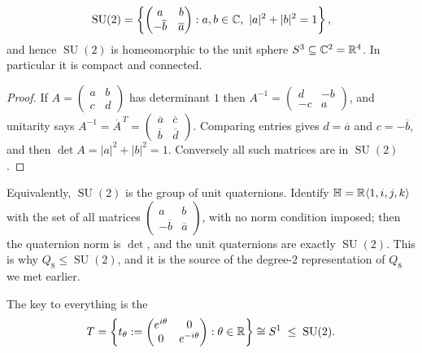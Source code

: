 \documentclass[a4paper]{scrartcl}
\newcommand{\SU}{\operatorname{SU}}
\newcommand{\gen}[1]{\langle #1 \rangle}
\newcommand{\HH}{\mathbb{H}}
\begin{document}
\begin{proposition}
	$$\SU(2) = \left\{\begin{pmatrix}a & b\\ -\overline b & \overline a\end{pmatrix} : a,b\in\C,\ |a|^2+|b|^2 = 1\right\},$$
	and hence $\SU(2)$ is homeomorphic to the unit sphere $S^3\subseteq\mathbb{C}^2 = \mathbb{R}^4$. In particular it is compact and connected.
\end{proposition}
\begin{proof}
	If $A = \left(\begin{smallmatrix}a&b\\c&d\end{smallmatrix}\right)$ has determinant $1$ then $A^{-1} = \left(\begin{smallmatrix}d&-b\\-c&a\end{smallmatrix}\right)$, and unitarity says $A^{-1} = \overline A^{\,T} = \left(\begin{smallmatrix}\overline a&\overline c\\ \overline b&\overline d\end{smallmatrix}\right)$. Comparing entries gives $d = \overline a$ and $c = -\overline b$, and then $\det A = |a|^2+|b|^2 = 1$. Conversely all such matrices are in $\SU(2)$.
\end{proof}

\begin{remark}
	Equivalently, $\SU(2)$ is the group of unit quaternions. Identify $\HH = \R\gen{1,i,j,k}$ with the set of all matrices $\left(\begin{smallmatrix}a&b\\-\overline b&\overline a\end{smallmatrix}\right)$, with no norm condition imposed; then the quaternion norm is $\det$, and the unit quaternions are exactly $\SU(2)$. This is why $Q_8\leq\SU(2)$, and it is the source of the degree-$2$ representation of $Q_8$ we met earlier.
\end{remark}

The key to everything is the 
$$T = \left\{ t_\theta := \begin{pmatrix}e^{i\theta}&0\\0&e^{-i\theta}\end{pmatrix} : \theta\in\R\right\} \cong S^1 \; \leq \; \SU(2).$$
\end{document}
